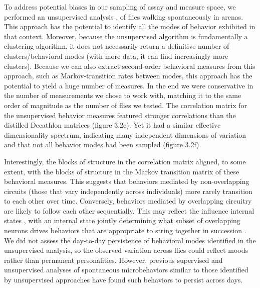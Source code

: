 \documentclass[12pt,letterpaper]{article}
\begin{document}
To address potential biases in our sampling of assay and measure space, we performed an unsupervised analysis \cite{berman_choi_bialek_shaevitz_2014,Cande_Optogenetic_2018}, of flies walking spontaneously in arenas. This approach has the potential to identify all the modes of behavior exhibited in that context. Moreover, because the unsupervised algorithm is fundamentally a clustering algorithm, it does not necessarily return a definitive number of clusters/behavioral modes (with more data, it can find increasingly more clusters). Because we can also extract second-order behavioral measures from this approach, such as Markov-transition rates between modes, this approach has the potential to yield a huge number of measures. In the end we were conservative in the number of measurements we chose to work with, matching it to the same order of magnitude as the number of flies we tested. The correlation matrix for the unsupervised behavior measures featured stronger correlations than the distilled Decathlon matrices (figure 3.2e). Yet it had a similar effective dimensionality spectrum, indicating many independent dimensions of variation and that not all behavior modes had been sampled (figure 3.2f). 

Interestingly, the blocks of structure in the correlation matrix aligned, to some extent, with the blocks of structure in the Markov transition matrix of these behavioral measures. This suggests that behaviors mediated by non-overlapping circuits (those that vary independently across individuals) more rarely transition to each other over time. Conversely, behaviors mediated by overlapping circuitry are likely to follow each other sequentially. This may reflect the influence internal states \cite{Calhoun_Unsupervised_2019}, with an internal state jointly determining what subset of overlapping neurons drives behaviors that are appropriate to string together in succession \cite{Seeds_A_2014}. We did not assess the day-to-day persistence of behavioral modes identified in the unsupervised analysis, so the observed variation across flies could reflect moods rather than permanent personalities. However, previous supervised \cite{Kain_Leg_2013} and unsupervised \cite{Todd_Systematic_2017} analyses of spontaneous microbehaviors similar to those identified by unsupervised approaches have found such behaviors to persist across days.
\end{document}
